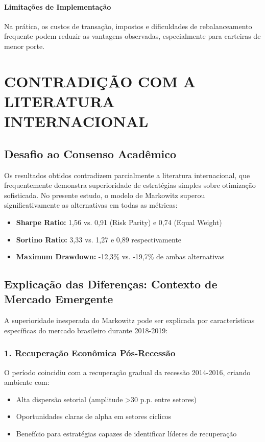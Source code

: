 \paragraph{Limitações de Implementação}
Na prática, os custos de transação, impostos e dificuldades de rebalanceamento frequente podem reduzir as vantagens observadas, especialmente para carteiras de menor porte.

\section{CONTRADIÇÃO COM A LITERATURA INTERNACIONAL}

\subsection{Desafio ao Consenso Acadêmico}

Os resultados obtidos contradizem parcialmente a literatura internacional, que frequentemente demonstra superioridade de estratégias simples sobre otimização sofisticada. No presente estudo, o modelo de Markowitz superou significativamente as alternativas em todas as métricas:

\begin{itemize}
    \item \textbf{Sharpe Ratio:} 1,56 vs. 0,91 (Risk Parity) e 0,74 (Equal Weight)
    \item \textbf{Sortino Ratio:} 3,33 vs. 1,27 e 0,89 respectivamente
    \item \textbf{Maximum Drawdown:} -12,3\% vs. -19,7\% de ambas alternativas
\end{itemize}

\subsection{Explicação das Diferenças: Contexto de Mercado Emergente}

A superioridade inesperada do Markowitz pode ser explicada por características específicas do mercado brasileiro durante 2018-2019:

\subsubsection{1. Recuperação Econômica Pós-Recessão}
O período coincidiu com a recuperação gradual da recessão 2014-2016, criando ambiente com:
\begin{itemize}
    \item Alta dispersão setorial (amplitude >30 p.p. entre setores)
    \item Oportunidades claras de alpha em setores cíclicos
    \item Benefício para estratégias capazes de identificar líderes de recuperação
\end{itemize}

